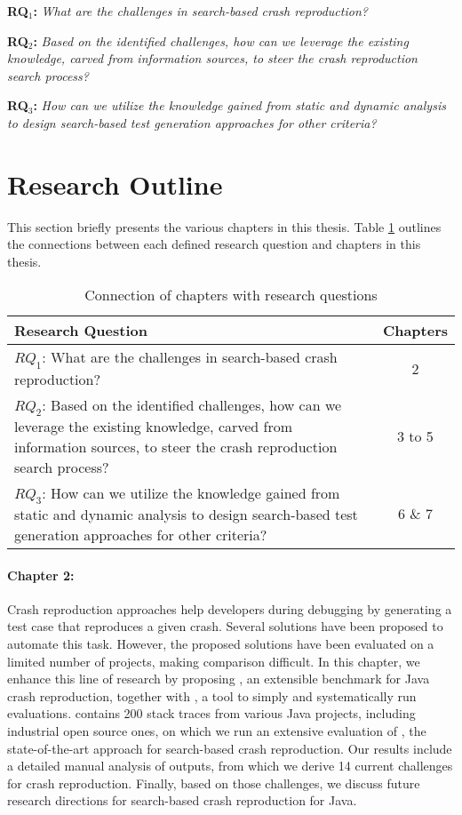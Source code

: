 \textbf{RQ$_1$: } \textit{What are the challenges in search-based crash reproduction?}

\textbf{RQ$_2$: } \textit{Based on the identified challenges, how can we leverage the existing knowledge, carved from information sources, to steer the crash reproduction search process?}

\textbf{RQ$_3$: } \textit{How can we utilize the knowledge gained from static and dynamic analysis to design search-based test generation approaches for other criteria?}


\section{Research Outline}

This section briefly presents the various chapters in this thesis.
Table \ref{tab:chaptersvsRQs} outlines the connections between each defined research question and chapters in this thesis.


\begin{table}[!t]
\caption{Connection of chapters with research questions}
\label{tab:chaptersvsRQs}
\begin{tabular}{|p{}||c|}
\textbf{Research Question} & \textbf{Chapters}\\
\hline
\hline
$RQ_1$: What are the challenges in search-based crash reproduction? & 2\\
$RQ_2$: Based on the identified challenges, how can we leverage the existing knowledge, carved from information sources, to steer the crash reproduction search process? & 3 to 5\\
$RQ_3$: How can we utilize the knowledge gained from static and dynamic analysis to design search-based test generation approaches for other criteria? & 6 \& 7\\
\hline
\end{tabular}
\end{table}


\paragraph{Chapter 2:}%
Crash reproduction approaches help developers during debugging by generating a test case that reproduces a given crash. 
Several solutions have been proposed to automate this task.
However, the proposed solutions have been evaluated on a limited number of projects, making comparison difficult.
In this chapter, we enhance this line of research by proposing \crashpack, an extensible benchmark for Java crash reproduction, together with \exrunner, a tool to simply and systematically run evaluations.
\crashpack contains 200 stack traces from various Java projects, including industrial open source ones, on which we run an extensive evaluation of \evocrash, the state-of-the-art approach for search-based crash reproduction.
Our results include a detailed manual analysis of \evocrash outputs, from which we derive 14 current challenges for crash reproduction. 
Finally, based on those challenges, we discuss future research directions for search-based crash reproduction for Java.

